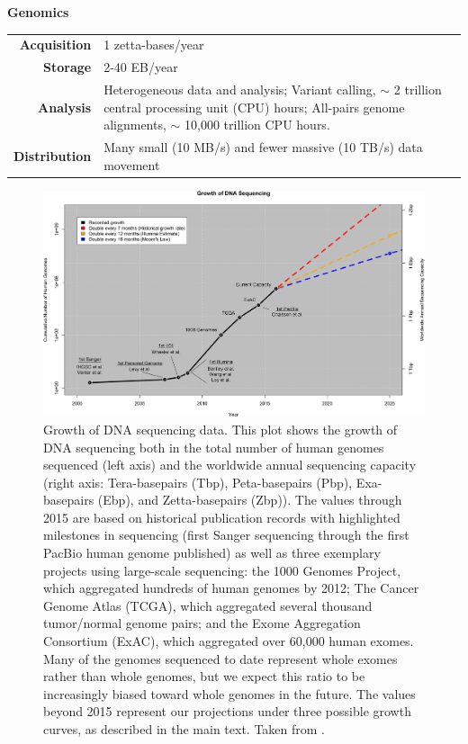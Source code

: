 \begin{table}[H]
\textbf{Genomics} \newline
\begin{tabular}{r|p{13cm}} \hline
    \small\textbf{Acquisition}  & \small  1 zetta-bases/year  \\
    \small\textbf{Storage}      & \small  2-40 EB/year \\
    \small\textbf{Analysis}     & \small Heterogeneous data and analysis;
      Variant calling, $\sim$ 2 trillion central processing unit (CPU) hours;
      All-pairs genome alignments,  $\sim$ 10,000 trillion CPU hours. \\
    \small\textbf{Distribution} & \small Many small (10 MB/s) and fewer massive (10 TB/s) data movement \\
\end{tabular}

\end{table}


\begin{figure}[]\centering
  \includegraphics[width=\textwidth]{fig/Growth.png}
  \caption{Growth of DNA sequencing data. This plot shows the growth of DNA sequencing both in the total number of human genomes sequenced (left axis) and the worldwide annual sequencing capacity (right axis: Tera-basepairs (Tbp), Peta-basepairs (Pbp), Exa-basepairs (Ebp), and Zetta-basepairs (Zbp)). The values through 2015 are based on historical publication records with highlighted milestones in sequencing (first Sanger sequencing through the first PacBio human genome published) as well as three exemplary projects using large-scale sequencing: the 1000 Genomes Project, which aggregated hundreds of human genomes by 2012; The Cancer Genome Atlas (TCGA), which aggregated several thousand tumor/normal genome pairs; and the Exome Aggregation Consortium (ExAC), which aggregated over 60,000 human exomes. Many of the genomes sequenced to date represent whole exomes rather than whole genomes, but we expect this ratio to be increasingly biased toward whole genomes in the future. The values beyond 2015 represent our projections under three possible growth curves, as described in the main text.
Taken from \cite{10.1371/journal.pbio.1002195}.}
\end{figure}


